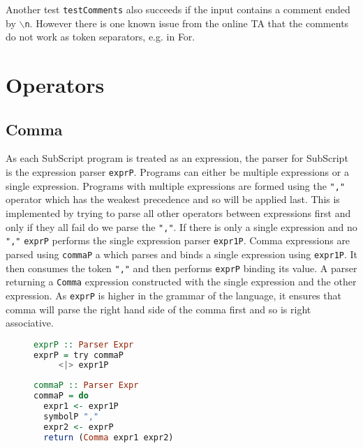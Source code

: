\documentclass{article}
\begin{document}
Another test \texttt{testComments} also succeeds if the input contains a comment ended by \texttt{$\backslash$n}. However there is one known issue from the online TA that the comments do not work as token separators, e.g. in For.


\section{Operators}
\subsection{Comma}
As each SubScript program is treated as an expression, the parser for SubScript is the expression parser \texttt{exprP}. Programs can either be multiple expressions or a single expression. Programs with multiple expressions are formed using the \texttt{","} operator which has the weakest precedence and so will be applied last. This is implemented by trying to parse all other operators between expressions first and only if they all fail do we parse the \texttt{","}. If there is only a single expression and no \texttt{","} \texttt{exprP} performs the single expression parser \texttt{expr1P}. 
\bigbreak
Comma expressions are parsed using \texttt{commaP} a
which parses and binds a single expression using \texttt{expr1P}. It then consumes the token \texttt{","} and then performs \texttt{exprP} binding its value. A parser returning a \texttt{Comma} expression constructed with the single expression and the other expression. As \texttt{exprP} is higher in the grammar of the language, it ensures that comma will parse the right hand side of the comma first and so is right associative.

\begin{figure}[h!]
\begin{minipage}{0.5\textwidth}
\begin{lstlisting}[language=Haskell]
exprP :: Parser Expr
exprP = try commaP
     <|> expr1P
\end{lstlisting}
\end{minipage}
\begin{minipage}{0.5\textwidth}
\begin{lstlisting}[language=Haskell]
commaP :: Parser Expr
commaP = do
  expr1 <- expr1P
  symbolP ","
  expr2 <- exprP
  return (Comma expr1 expr2)
\end{lstlisting}
\end{minipage}
\end{figure}
\end{document}
